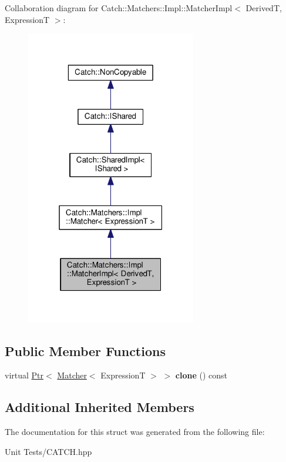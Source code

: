 Collaboration diagram for Catch\+:\+:Matchers\+:\+:Impl\+:\+:Matcher\+Impl$<$ DerivedT, ExpressionT $>$\+:
\nopagebreak
\begin{figure}[H]
\begin{center}
\leavevmode
\includegraphics[width=211pt]{structCatch_1_1Matchers_1_1Impl_1_1MatcherImpl__coll__graph}
\end{center}
\end{figure}
\subsection*{Public Member Functions}
\begin{DoxyCompactItemize}
\item 
virtual \hyperlink{classCatch_1_1Ptr}{Ptr}$<$ \hyperlink{structCatch_1_1Matchers_1_1Impl_1_1Matcher}{Matcher}$<$ ExpressionT $>$ $>$ {\bfseries clone} () const \hypertarget{structCatch_1_1Matchers_1_1Impl_1_1MatcherImpl_afe2e10779f91394f80ff5c894fb1bfab}{}\label{structCatch_1_1Matchers_1_1Impl_1_1MatcherImpl_afe2e10779f91394f80ff5c894fb1bfab}

\end{DoxyCompactItemize}
\subsection*{Additional Inherited Members}


The documentation for this struct was generated from the following file\+:\begin{DoxyCompactItemize}
\item 
Unit Tests/C\+A\+T\+C\+H.\+hpp\end{DoxyCompactItemize}
